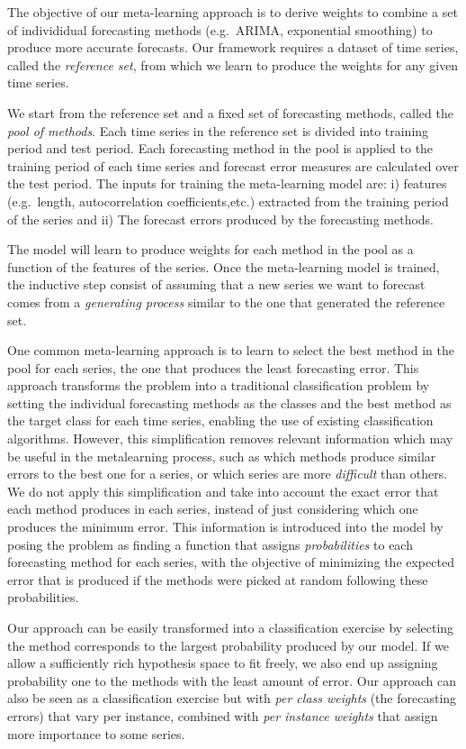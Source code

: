 \documentclass[11pt,a4paper,]{article}
\theoremstyle{definition}
\theoremstyle{definition}
\theoremstyle{definition}
\theoremstyle{remark}
\begin{document}
The objective of our meta-learning approach is to derive weights to
combine a set of individidual forecasting methods (e.g.~ARIMA,
exponential smoothing) to produce more accurate forecasts. Our framework
requires a dataset of time series, called the \emph{reference set}, from
which we learn to produce the weights for any given time series.

We start from the reference set and a fixed set of forecasting methods,
called the \emph{pool of methods}. Each time series in the reference set
is divided into training period and test period. Each forecasting method
in the pool is applied to the training period of each time series and
forecast error measures are calculated over the test period. The inputs
for training the meta-learning model are: i) features (e.g.~length,
autocorrelation coefficients,etc.) extracted from the training period of
the series and ii) The forecast errors produced by the forecasting
methods.

The model will learn to produce weights for each method in the pool as a
function of the features of the series. Once the meta-learning model is
trained, the inductive step consist of assuming that a new series we
want to forecast comes from a \emph{generating process} similar to the
one that generated the reference set.

One common meta-learning approach is to learn to select the best method
in the pool for each series, the one that produces the least forecasting
error. This approach transforms the problem into a traditional
classification problem by setting the individual forecasting methods as
the classes and the best method as the target class for each time
series, enabling the use of existing classification algorithms. However,
this simplification removes relevant information which may be useful in
the metalearning process, such as which methods produce similar errors
to the best one for a series, or which series are more \emph{difficult}
than others. We do not apply this simplification and take into account
the exact error that each method produces in each series, instead of
just considering which one produces the minimum error. This information
is introduced into the model by posing the problem as finding a function
that assigns \emph{probabilities} to each forecasting method for each
series, with the objective of minimizing the expected error that is
produced if the methods were picked at random following these
probabilities.

Our approach can be easily transformed into a classification exercise by
selecting the method corresponds to the largest probability produced by
our model. If we allow a sufficiently rich hypothesis space to fit
freely, we also end up assigning probability one to the methods with the
least amount of error. Our approach can also be seen as a classification
exercise but with \emph{per class weights} (the forecasting errors) that
vary per instance, combined with \emph{per instance weights} that assign
more importance to some series.
\end{document}
